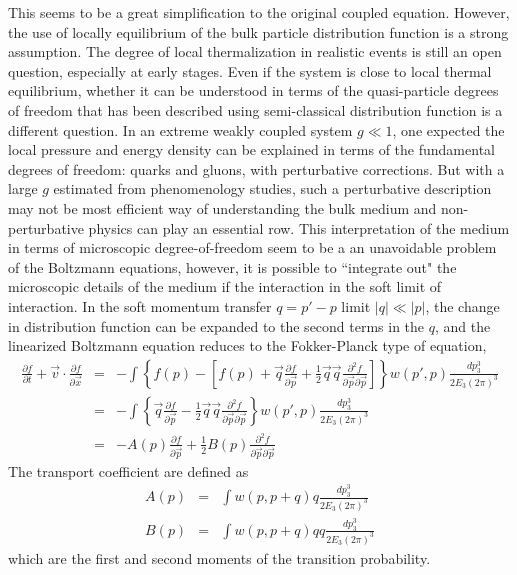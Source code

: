 This seems to be a great simplification to the original coupled equation. However, the use of locally equilibrium of the bulk particle distribution function is a strong assumption. 
The degree of local thermalization in realistic events is still an open question, especially at early stages. 
Even if the system is close to local thermal equilibrium, whether it can be understood in terms of the quasi-particle degrees of freedom that has been described using semi-classical distribution function is a different question.
In an extreme weakly coupled system $g\ll 1$, one expected the local pressure and energy density can be explained in terms of the fundamental degrees of freedom: quarks and gluons, with perturbative corrections.
But with a large $g$ estimated from phenomenology studies, such a perturbative description may not be most efficient way of understanding the bulk medium and non-perturbative physics can play an essential row. 
This interpretation of the medium in terms of microscopic degree-of-freedom seem to be a an unavoidable problem of the Boltzmann equations, however, it is possible to ``integrate out" the microscopic details of the medium if the interaction in the soft limit of interaction.
In the soft momentum transfer $q = p'-p$ limit  $|q| \ll |p|$, the change in distribution function can be expanded to the second terms in the $q$, and the linearized Boltzmann equation reduces to the Fokker-Planck type of equation,
\begin{eqnarray}
\frac{\partial f}{\partial t} + \vec{v}\cdot\frac{\partial f}{\partial \vec{x}} &=& - \int \left\{
f(p) - \left[f(p) +  \vec{q}\frac{\partial f}{\partial\vec{p}} + \frac{1}{2}\vec{q}\vec{q}\frac{\partial^2 f}{\partial\vec{p} \partial\vec{p}} \right]
\right\} w(p',p)\frac{dp_3^3}{2E_3 (2\pi)^3} \\
&=& - \int \left\{ \vec{q}\frac{\partial f}{\partial\vec{p}} - \frac{1}{2}\vec{q}\vec{q}\frac{\partial^2 f}{\partial\vec{p} \partial\vec{p}}
\right\} w(p',p)\frac{dp_3^3}{2E_3 (2\pi)^3} \\
&=&  -A(p) \frac{\partial f}{\partial\vec{p}} + \frac{1}{2}B(p)\frac{\partial^2 f}{\partial\vec{p} \partial\vec{p}}
\end{eqnarray}
The transport coefficient are defined as
\begin{eqnarray}
A(p) &=& \int w(p,p+q) q \frac{dp_3^3}{2E_3 (2\pi)^3}\\
B(p) &=& \int w(p,p+q) q q \frac{dp_3^3}{2E_3 (2\pi)^3}
\end{eqnarray}
which are the first and second moments of the transition probability.
